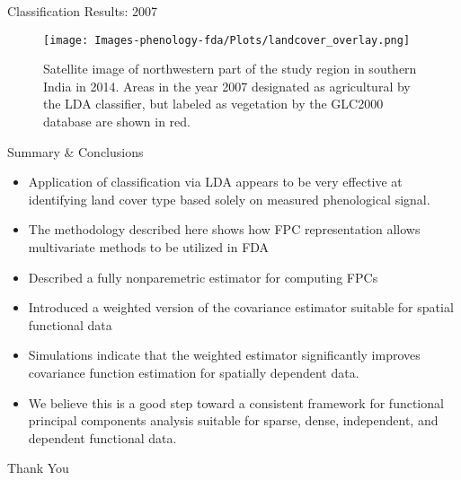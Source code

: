 \documentclass{beamer}
\begin{document}
\begin{frame}[t]{Classification Results: 2007}
	\begin{figure}
		[htbp] \centering
		\texttt{[image: Images-phenology-fda/Plots/landcover\_overlay.png]} \\
		\caption{Satellite image of northwestern part of the study region in southern India in 2014. Areas in the year 2007 designated as agricultural by the LDA classifier, but labeled as vegetation by the GLC2000 database are shown in red.}
	\end{figure}

\end{frame}

\begin{frame}[t]{Summary \& Conclusions}
	\begin{itemize}
		\item Application of classification via LDA appears to be very effective at identifying land cover type based solely on measured phenological signal.
				\item The methodology described here shows how FPC representation allows multivariate methods to be utilized in FDA
		\item Described a fully nonparemetric estimator for computing FPCs
		\item Introduced a weighted version of the covariance estimator suitable for spatial functional data
		 \item Simulations indicate that the weighted estimator significantly improves covariance function estimation for spatially dependent data.
		 \item We believe this is a good step toward a consistent framework for functional principal components analysis suitable for sparse, dense, independent, and dependent functional data.
	\end{itemize}

\end{frame}

\begin{frame}[t]
	\vspace{1in}
	\begin{center}
	\Huge{Thank You}
	\end{center}
\end{frame}
%
\end{document}
